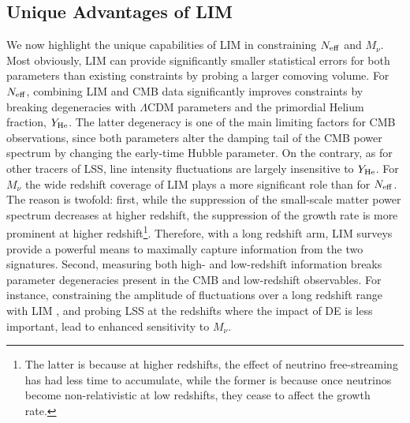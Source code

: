 \documentclass[twocolumn]{aastex631}
\begin{document}
\subsection{Unique Advantages of LIM}

We now highlight the unique capabilities of LIM in constraining $N_{\rm eff}$ and $M_\nu$. Most obviously, LIM can provide significantly smaller statistical errors for both parameters than existing constraints by probing a larger comoving volume. For $N_{\rm eff}$, combining LIM and CMB data significantly improves constraints by breaking degeneracies with $\Lambda$CDM parameters and the primordial Helium fraction, $Y_{\rm He}$. The latter degeneracy is one of the main limiting factors for CMB observations, since both parameters alter the damping tail of the CMB power spectrum by changing the early-time Hubble parameter. On the contrary, as for other tracers of LSS, line intensity fluctuations are largely insensitive to $Y_{\rm He}$. For $M_\nu$ the wide redshift coverage of LIM plays a more significant role than for $N_{\rm eff}$. The reason is twofold: first, while the suppression of the small-scale matter power spectrum decreases at higher redshift, the suppression of the growth rate is more prominent at higher redshift\footnote{The latter is because at higher redshifts, the effect of neutrino free-streaming has had less time to accumulate, while the former is because once neutrinos become non-relativistic at low redshifts, they cease to affect the growth rate.}. Therefore, with a long redshift arm, LIM surveys provide a powerful means to maximally capture information from the two signatures. Second, measuring both high- and low-redshift information breaks parameter degeneracies present in the CMB and low-redshift observables. For instance, constraining the amplitude of fluctuations over a long redshift range with LIM \citep{Schmittfull:2017ffw, Yu:2018tem}, and probing LSS at the redshifts where the impact of DE is less important, lead to enhanced sensitivity to $M_\nu$. 
\end{document}
